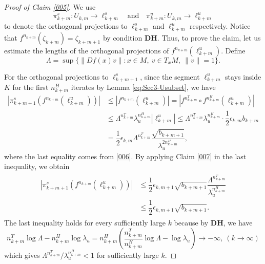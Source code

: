 \documentclass{amsart}
\theoremstyle{plain}
\theoremstyle{definition}
\theoremstyle{remark}
\numberwithin{equation}{section}
\begin{document}
\begin{proof}[Proof of Claim \ref{005}]
We use 
\[\pi^s_{k+m}:U_{k,m}\to \ell_{k+m}^s
\quad\mbox{and}\quad
\pi^u_{k+m}:U_{k,m}\to \ell_{k+m}^u
\]
to denote the orthogonal projections to $\ell_{k+m}^s$ and $\ell_{k+m}^u$ respectively. Notice that $f^{n_{k+m}}(\zeta_{k+m})=\zeta_{k+m+1}$ by condition {\bf DH}. Thus, to prove the claim, let us estimate the lengths of the orthogonal projections of $f^{n_{k+m}}(\ell_{k+m}^u)$. Define
\[\Lambda=\sup\big\{\|Df(x)v\|:x\in M,\ v\in T_xM,\ \|v\|=1\big\}.\]

For the orthogonal projections to $\ell^s_{k+m+1}$, since the segment $\ell_{k+m}^u$ stays inside $K$ for the first
$n_{k+m}^H$ iterates by Lemma \ref{eq:Sec3-Usubset}, we have 
\begin{align*}
|\pi^s_{k+m+1}(f^{n_{k+m}}(\ell^u_{k+m}))|
&\le |f^{n_{k+m}}(\ell^u_{k+m})| = |f^{n_{k+m}^T}\circ f^{n_{k+m}^H}(\ell^u_{k+m})|\\
&\le \Lambda^{n_{k+m}^T}\lambda_u^{n_{k+m}^H}|\ell_{k+m}^u|
\le \Lambda^{n_{k+m}^T}\lambda_u^{n_{k+m}^H}\cdot \dfrac{1}{2}\epsilon_{k,m}b_{k+m}\\
&= \dfrac{1}{2}\epsilon_{k,m}\Lambda^{n_{k+m}^T}\dfrac{\sqrt{b_{k+m+1}}}{\lambda_u^{2n_{k+m}^H}},
\end{align*}
where the last equality comes from \eqref{006}. By applying Claim \ref{007} in the last inequality, we obtain
\begin{align}\label{105}
\begin{split}
|\pi^s_{k+m+1}(f^{n_{k+m}}(\ell^u_{k+m}))|
&\le \dfrac{1}{2}\epsilon_{k,m+1}\sqrt{b_{k+m+1}}\dfrac{\Lambda^{n_{k+m}^T}}{\lambda_u^{n_{k+m}^H}}\\
&\le\dfrac{1}{2}\epsilon_{k,m+1}\sqrt{b_{k+m+1}}.
\end{split}
\end{align}
The last inequality holds for every sufficiently large $k$ because by {\bf DH}, we have
\[n^T_{k+m}\log \Lambda-n^H_{k+m}\log\lambda_u=n^H_{k+m}\left(\dfrac{n^T_{k+m}}{n^H_{k+m}}\log \Lambda-\log\lambda_u\right)\to -\infty,\ (k\to\infty)\]
which gives $\Lambda^{n_{k+m}^T}/\lambda_u^{n_{k+m}^H}<1$ for sufficiently large $k$.


\end{proof}
\end{document}
